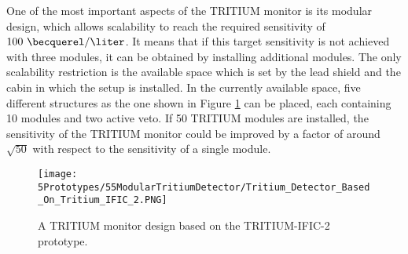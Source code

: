 One of the most important aspects of the TRITIUM monitor is its modular design, which allows scalability to reach the required sensitivity of $100~\becquerel/\liter$. It means that if this target sensitivity is not achieved with three modules, it can be obtained by installing additional modules. The only scalability restriction is the available space which is set by the lead shield and the cabin in which the setup is installed. In the currently available space, five different structures as the one shown in Figure \ref{fig:TritiumMonitorIFIC2Design} can be placed, each containing 10 modules and two active veto. If 50 TRITIUM modules are installed, the sensitivity of the TRITIUM monitor could be improved by a factor of around $\sqrt{50}$ with respect to the sensitivity of a single module.

\begin{figure}[h]
\centering
\texttt{[image: 5Prototypes/55ModularTritiumDetector/Tritium\_Detector\_Based\_On\_Tritium\_IFIC\_2.PNG]}
\caption{A TRITIUM monitor design based on the TRITIUM-IFIC-2 prototype.\label{fig:TritiumMonitorIFIC2Design}}
\end{figure}